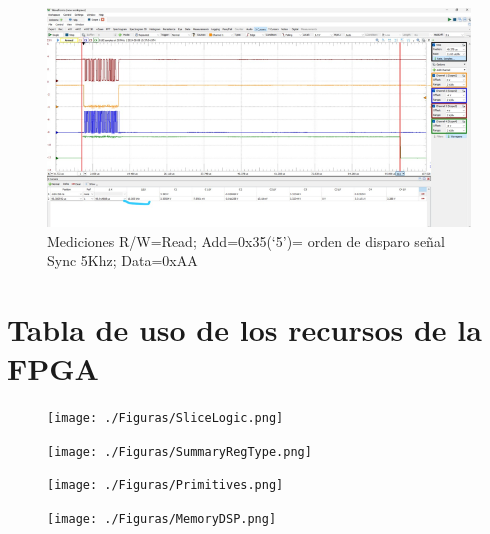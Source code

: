 \documentclass[
11pt, %
]{charter}
\begin{document}
\vspace{25px}


\begin{figure}[htpb]
\centering 
\includegraphics[width=.95\textwidth]{./Figuras/SeñalesTxy5K.png}
\caption{Mediciones R/W=Read; Add=0x35(‘5’)= orden de disparo señal Sync 5Khz; Data=0xAA}
\label{fig:diagBloques}
\end{figure}

\vspace{25px}

\newpage

\section{Tabla de uso de los recursos de la FPGA}
\label{sec:orgd0babc0}

\begin{figure}[htpb]
\centering 
\texttt{[image: ./Figuras/SliceLogic.png]}
\end{figure}

\begin{figure}[htpb]
\centering 
\texttt{[image: ./Figuras/SummaryRegType.png]}
\end{figure}

\begin{figure}[htpb]
\centering 
\texttt{[image: ./Figuras/Primitives.png]}
\end{figure}


\begin{figure}[htpb]
\centering 
\texttt{[image: ./Figuras/MemoryDSP.png]}
\end{figure}
\end{document}
